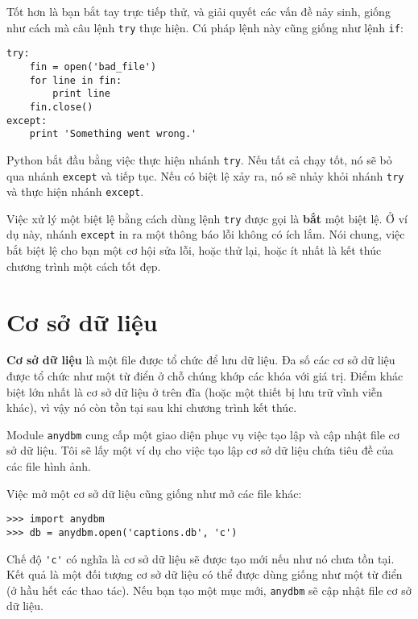 \documentclass[11pt]{book}
\begin{document}

Tốt hơn là bạn bắt tay trực tiếp thử, và giải quyết các vấn đề nảy sinh,
giống như cách mà câu lệnh {\tt try} thực hiện. Cú pháp lệnh này cũng
giống như lệnh {\tt if}:

\beforeverb
\begin{verbatim}
try:    
    fin = open('bad_file')
    for line in fin:
        print line
    fin.close()
except:
    print 'Something went wrong.'
\end{verbatim}
\afterverb
%
Python bắt đầu bằng việc thực hiện nhánh {\tt try}. Nếu tất cả
chạy tốt, nó sẽ bỏ qua nhánh {\tt except} và tiếp tục. Nếu có
biệt lệ xảy ra, nó sẽ nhảy khỏi nhánh {\tt try} và thực hiện
nhánh {\tt except}.

Việc xử lý một biệt lệ bằng cách dùng lệnh {\tt try} được gọi là {\bf
bắt} một biệt lệ. Ở ví dụ này, nhánh {\tt except} 
in ra một thông báo lỗi không có ích lắm. Nói chung, việc bắt biệt lệ
cho bạn một cơ hội sửa lỗi, hoặc thử lại, hoặc ít nhất là kết thúc
chương trình một cách tốt đẹp.


\section{Cơ sở dữ liệu}


{\bf Cơ sở dữ liệu} là một file được tổ chức để lưu dữ liệu.
Đa số các cơ sở dữ liệu được tổ chức như một từ điển ở chỗ
chúng khớp các khóa với giá trị. Điểm khác biệt lớn nhất là
cơ sở dữ liệu ở trên đĩa (hoặc một thiết bị lưu trữ vĩnh viễn khác),
vì vậy nó còn tồn tại sau khi chương trình kết thúc.


Module {\tt anydbm} cung cấp một giao diện phục vụ việc tạo lập
và cập nhật file cơ sở dữ liệu. Tôi sẽ lấy một ví dụ cho việc tạo lập
cơ sở dữ liệu chứa tiêu đề của các file hình ảnh.


Việc mở một cơ sở dữ liệu cũng giống như mở các file khác:

\beforeverb
\begin{verbatim}
>>> import anydbm
>>> db = anydbm.open('captions.db', 'c')
\end{verbatim}
\afterverb
%
Chế độ \verb"'c'" có nghĩa là cơ sở dữ liệu sẽ được tạo mới
nếu như nó chưa tồn tại. Kết quả là một đối tượng cơ sở dữ liệu
có thể được dùng giống như một từ điển (ở hầu hết các thao tác).
Nếu bạn tạo một mục mới, {\tt anydbm} sẽ cập nhật file cơ sở dữ liệu.
\end{document}
